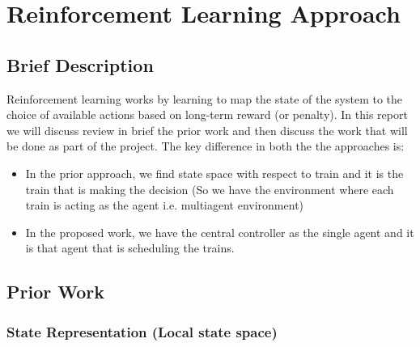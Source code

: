 \chapter{Reinforcement Learning Approach}

\section{Brief Description}
Reinforcement learning works by learning to map the 
state of the system to the choice of available actions based on long-term reward 
(or penalty). In this report we will discuss review in brief the prior work \cite{ARTICLE:1} and then discuss the work that will be done as part of the project.  The key difference in both the
the approaches is:
\begin{itemize}
\item In the prior approach, we find state space with respect to train and it is the train that is making the 
decision (So we have the environment where each train is acting as the agent i.e. multiagent environment) 
\item In the proposed work, we have the central controller as the single agent and it is that
agent that is scheduling the trains.
\end{itemize}

\section {Prior Work}
\subsection{State Representation (Local state space)}


